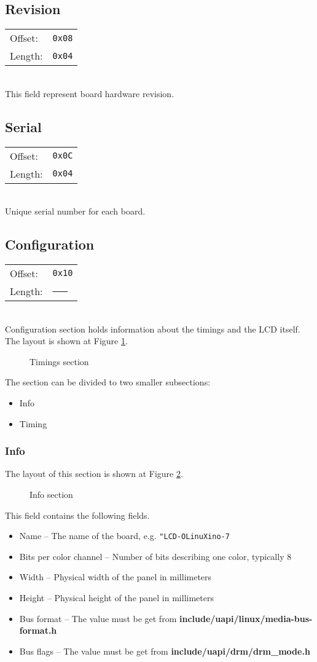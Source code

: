 \documentclass{article}
\newcommand{\regs}[2]{
	\begin{tabular}{l l}
		Offset: & \texttt{#1} \\
		Length: & \texttt{#2}
	\end{tabular} \\
	}
\begin{document}
	\subsection{Revision}
	\regs{0x08}{0x04}

	This field represent board hardware revision.

	\subsection{Serial}
	\regs{0x0C}{0x04}

	Unique serial number for each board.
	
	

	\subsection{Configuration}
	\regs{0x10}{--------}

	Configuration section holds information about the timings and the LCD itself.
	The layout is shown at Figure \ref{fig:EEPROM_CONFIG}.
	
	\begin{figure}[H]
		\centering
		
		\caption{Timings section}
		\label{fig:EEPROM_CONFIG}
	\end{figure}
	
	The section can be divided to two smaller subsections:
	\begin{itemize}
		\item Info
		\item Timing
	\end{itemize}

		\subsubsection{Info}
		The layout of this section is shown at Figure \ref{fig:EEPROM_INFO}.
		\begin{figure}[H]
			\centering
			
			\caption{Info section}
			\label{fig:EEPROM_INFO}
		\end{figure}
		
		This field contains the following fields.
		\begin{itemize}
			\item Name -- The name of the board, e.g. \texttt{"LCD-OLinuXino-7}
			\item Bits per color channel -- Number of bits describing one color, typically 8
			\item Width -- Physical width of the panel in millimeters
			\item Height -- Physical height of the panel in millimeters
			\item Bus format -- The value must be get from
			\textbf{include/uapi/linux/media-bus-format.h}
			\item Bus flags -- The value must be get from \textbf{include/uapi/drm/drm\_mode.h}
		\end{itemize}
		
\end{document}
